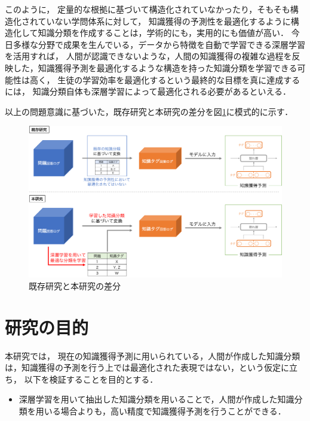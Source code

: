 このように，
定量的な根拠に基づいて構造化されていなかったり，そもそも構造化されていない学問体系に対して，
知識獲得の予測性を最適化するように構造化して知識分類を作成することは，学術的にも，実用的にも価値が高い．
今日多様な分野で成果を生んでいる，データから特徴を自動で学習できる深層学習を活用すれば，
人間が認識できないような，人間の知識獲得の複雑な過程を反映した，知識獲得予測を最適化するような構造を持った知識分類を学習できる可能性は高く，
生徒の学習効率を最適化するという最終的な目標を真に達成するには，
知識分類自体も深層学習によって最適化される必要があるといえる．



以上の問題意識に基づいた，既存研究と本研究の差分を図\ref{fig:problem}に模式的に示す．

\begin{figure}[htb]
\begin{center}
\includegraphics[width=400pt]{./img/problem3.pdf}
\end{center}
\caption{既存研究と本研究の差分}
\label{fig:problem}
\end{figure}


\section{研究の目的}
本研究では，
現在の知識獲得予測に用いられている，人間が作成した知識分類は，知識獲得の予測を行う上では最適化された表現ではない，という仮定に立ち，
以下を検証することを目的とする．

\begin{itemize}
\item 深層学習を用いて抽出した知識分類を用いることで，人間が作成した知識分類を用いる場合よりも，高い精度で知識獲得予測を行うことができる．
\end{itemize}

